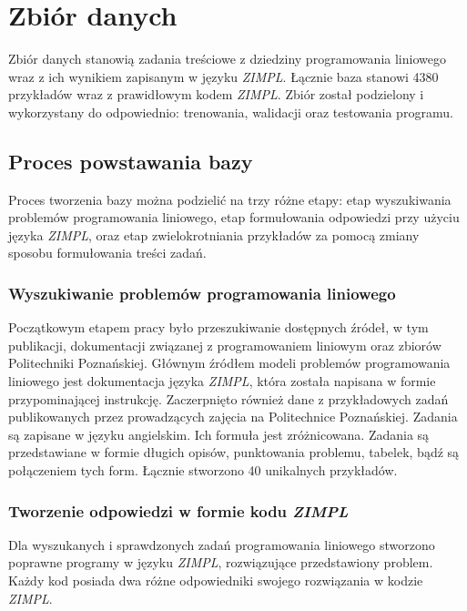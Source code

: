 
\chapter{Zbiór danych}

Zbiór danych stanowią zadania treściowe z dziedziny programowania liniowego wraz z ich wynikiem zapisanym w języku \textit{ZIMPL}. Łącznie baza stanowi 4380 przykładów wraz z prawidłowym kodem \textit{ZIMPL}. Zbiór został podzielony i wykorzystany do odpowiednio: trenowania, walidacji oraz testowania programu.

\section{Proces powstawania bazy}

Proces tworzenia bazy można podzielić na trzy różne etapy: etap wyszukiwania problemów programowania liniowego, etap formułowania odpowiedzi przy użyciu języka \textit{ZIMPL}, oraz etap zwielokrotniania przykładów za pomocą zmiany sposobu formułowania treści zadań.

\subsection{Wyszukiwanie problemów programowania liniowego}

Początkowym etapem pracy było przeszukiwanie dostępnych źródeł, w tym publikacji, dokumentacji związanej z programowaniem liniowym\cite{brilliant_linear}\cite{byjus_linear}\cite{cimt}\cite{arsdcollege2020}\cite{libretexts_linear}\cite{superprof_linear}\cite{toppr_graphical} oraz zbiorów Politechniki Poznańskiej. Głównym źródłem modeli problemów programowania liniowego jest dokumentacja języka  \textit{ZIMPL}, która została napisana w formie przypominającej instrukcję. Zaczerpnięto również dane z przykładowych zadań publikowanych przez prowadzących zajęcia na Politechnice Poznańskiej. Zadania są zapisane w języku angielskim. Ich formuła jest zróżnicowana. Zadania są przedstawiane w formie długich opisów, punktowania problemu, tabelek, bądź są połączeniem tych form. Łącznie stworzono 40 unikalnych przykładów.

\subsection{Tworzenie odpowiedzi w formie kodu  \textit{ZIMPL}}

Dla wyszukanych i sprawdzonych zadań programowania liniowego stworzono poprawne programy w języku  \textit{ZIMPL}, rozwiązujące przedstawiony problem. Każdy kod posiada dwa różne odpowiedniki swojego rozwiązania w kodzie  \textit{ZIMPL}. 

